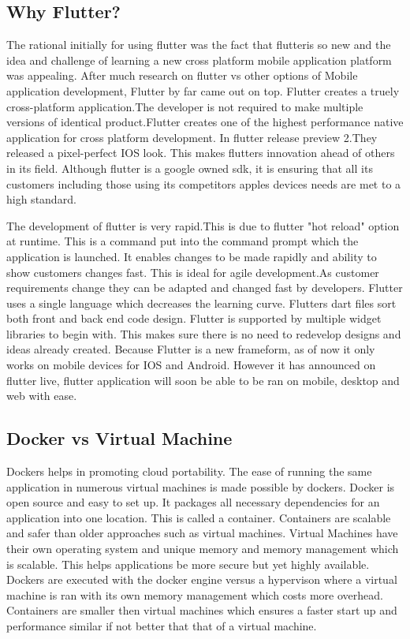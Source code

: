 \subsection{Why Flutter?}
The rational initially for using flutter was the fact that flutteris so new and the idea and challenge of learning a new cross platform mobile application platform was appealing. After much research on flutter vs other options of Mobile application development, Flutter by far came out on top. Flutter creates a truely cross-platform application.The developer is not required to make multiple versions of identical product.Flutter creates one of the highest performance native application for cross platform development. In flutter release preview 2.They released a pixel-perfect IOS look. This makes flutters innovation ahead of others in its field. Although flutter is a google owned sdk, it is ensuring that all its customers including those using its competitors apples devices needs are met to a high standard.

The development of flutter is very rapid.This is due to flutter "hot reload" option at runtime. This is a command put into the command prompt which the application is launched. It enables changes to be made rapidly and ability to show customers changes fast. This is ideal for agile development.As customer requirements change they can be adapted and changed fast by developers. Flutter uses a single language which decreases the learning curve. Flutters dart files sort both front and back end code design. Flutter is supported by multiple widget libraries to begin with. This makes sure there is no need to redevelop designs and ideas already created. Because Flutter is a new frameform, as of now it only works on mobile devices for IOS and Android. However it has announced on flutter live, flutter application will soon be able to be ran on mobile, desktop and web with ease.

\subsection{Docker vs Virtual Machine}
Dockers helps in promoting cloud portability. The ease of running the same application in numerous virtual machines is made possible by dockers. Docker is open source and easy to set up. It packages all necessary dependencies for an application into one location. This is called a container. Containers are scalable and safer than older approaches such as virtual machines. Virtual Machines have their own operating system and unique memory and memory management which is scalable.\cite{seshachala_2019} This helps applications be more secure but yet highly available. Dockers are executed with the docker engine versus a hypervison where a virtual machine is ran with its own memory management which costs more overhead. Containers are smaller then virtual machines which ensures a faster start up and performance similar if not better that that of a virtual machine.\cite{bauer_bauer_2019}

